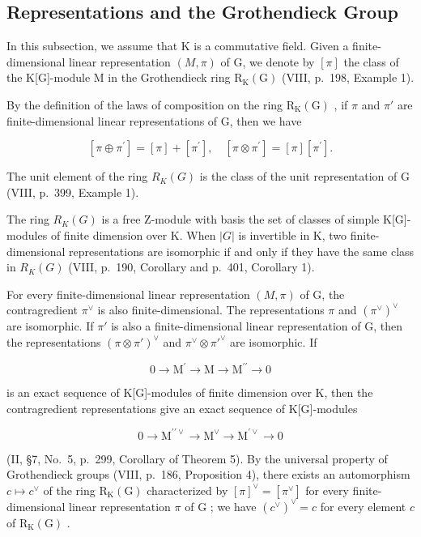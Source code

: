 \subsection{Representations and the Grothendieck Group}

In this subsection, we assume that K is a commutative field. Given a finite-dimensional linear representation \((M,\pi)\) of G, we denote by \([\pi]\) the class of the K{[}G{]}-module M in the Grothendieck ring \(\mathrm{R}_{\mathrm{K}}(\mathrm{G})\) (VIII, p.~198, Example 1).

By the definition of the laws of composition on the ring \(\mathrm{R}_{\mathrm{K}}(\mathrm{G})\) , if \(\pi\) and \(\pi'\) are finite-dimensional linear representations of G, then we have

\[
[ \pi \oplus \pi^ {\prime} ] = [ \pi ] + [ \pi^ {\prime} ], \quad [ \pi \otimes \pi^ {\prime} ] = [ \pi ] [ \pi^ {\prime} ].
\]

The unit element of the ring \(R_{K}(G)\) is the class of the unit representation of G (VIII, p.~399, Example 1).

The ring \(R_{K}(G)\) is a free Z-module with basis the set of classes of simple K{[}G{]}-modules of finite dimension over K. When \(|G|\) is invertible in K, two finite-dimensional representations are isomorphic if and only if they have the same class in \(R_{K}(G)\) (VIII, p.~190, Corollary and p.~401, Corollary 1).

For every finite-dimensional linear representation \((M,\pi)\) of G, the contragredient \(\pi^{\vee}\) is also finite-dimensional. The representations \(\pi\) and \((\pi^{\vee})^{\vee}\) are isomorphic. If \(\pi'\) is also a finite-dimensional linear representation of G, then the representations \((\pi\otimes\pi')^{\vee}\) and \(\pi^{\vee}\otimes\pi'^{\vee}\) are isomorphic. If

\[
0 \longrightarrow \mathrm{M} ^ {\prime} \longrightarrow \mathrm{M} \longrightarrow \mathrm{M} ^ {\prime \prime} \longrightarrow 0
\]

is an exact sequence of K{[}G{]}-modules of finite dimension over K, then the contragredient representations give an exact sequence of K{[}G{]}-modules

\[
0 \longrightarrow \mathrm{M} ^ {\prime \prime \vee} \longrightarrow \mathrm{M} ^ {\vee} \longrightarrow \mathrm{M} ^ {\prime \vee} \longrightarrow 0
\]

(II, §7, No.~5, p.~299, Corollary of Theorem 5). By the universal property of Grothendieck groups (VIII, p.~186, Proposition 4), there exists an automorphism \(c \mapsto c^{\vee}\) of the ring \(\mathrm{R}_{\mathrm{K}}(\mathrm{G})\) characterized by \([\pi]^{\vee} = [\pi^{\vee}]\) for every finite-dimensional linear representation \(\pi\) of \(\mathrm{G}\) ; we have \((c^{\vee})^{\vee} = c\) for every element \(c\) of \(\mathrm{R}_{\mathrm{K}}(\mathrm{G})\) .

